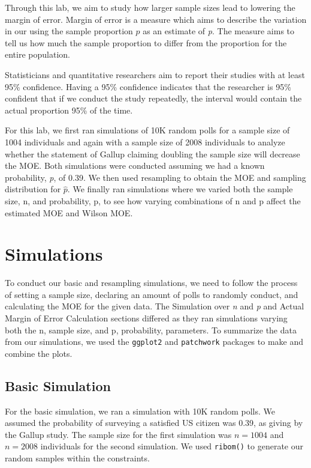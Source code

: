 \documentclass{article}\usepackage[]{graphicx}\usepackage[]{xcolor}
\begin{document}
\begin{multicols}{2}
Through this lab, we aim to study how larger sample sizes lead to lowering the margin of error. Margin of error is a measure which aims to describe the variation in our using the sample proportion $\hat{p}$ as an estimate of \textit{p}. The measure aims to tell us how much the sample proportion to differ from the proportion for the entire population.

Statisticians and quantitative researchers aim to report their studies with at least 95\% confidence. Having a 95\% confidence indicates that the researcher is 95\% confident that if we conduct the study repeatedly, the interval would contain the actual proportion 95\% of the time.

For this lab, we first ran simulations of 10K random polls for a sample size of 1004 individuals and again with a sample size of 2008 individuals to analyze whether the statement of Gallup claiming doubling the sample size will decrease the MOE. Both simulations were conducted assuming we had a known probability, \textit{p}, of 0.39. We then used resampling to obtain the MOE and sampling distribution for $\hat{p}$. We finally ran simulations where we varied both the sample size, n, and probability, p, to see how varying combinations of n and p affect the estimated MOE and Wilson MOE.

\section{Simulations}
To conduct our basic and resampling simulations, we need to follow the process of setting a sample size, declaring an amount of polls to randomly conduct, and calculating the MOE for the given data. The Simulation over \textit{n} and \textit{p} and Actual Margin of Error Calculation sections differed as they ran simulations varying both the n, sample size, and p, probability, parameters. To summarize the data from our simulations, we used the \texttt{ggplot2} \citep{ggplot2} and \texttt{patchwork} \citep{patchwork} packages to make and combine the plots.

\subsection{Basic Simulation}
For the basic simulation, we ran a simulation with 10K random polls. We assumed the probability of surveying a satisfied US citizen was 0.39, as giving by the Gallup study. The sample size for the first simulation was $n = 1004$ and $n = 2008$ individuals for the second simulation. We used \texttt{ribom()} to generate our random samples within the constraints.


\end{multicols}
\end{document}
